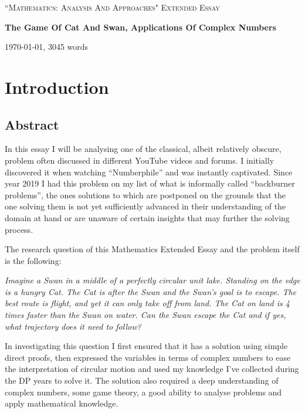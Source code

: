 \documentclass[12pt]{article}
\begin{document}
\begin{titlepage}
	\centering
	\vspace{1cm}
	{\Large \textsc{``Mathematics: Analysis And Approaches" Extended Essay}\par}
	\vspace{1.5cm}
	{\huge\bfseries The Game Of Cat And Swan, Applications Of Complex Numbers\par}
	\vspace{2cm}
	\vfill
	{\large \today, 3045 words\par}
\end{titlepage}

\clearpage
{}
\tableofcontents


\section{Introduction}
\subsection{Abstract}

In this essay I will be analysing one of the classical, albeit relatively obscure, problem often discussed in different YouTube videos and forums. I initially discovered it when watching ``Numberphile''\cite{Catandmouse} and was instantly captivated. Since year 2019 I had this problem on my list of what is informally called ``backburner problems'', the ones solutions to which are postponed on the grounds that the one solving them is not yet sufficiently advanced in their understanding of the domain at hand or are unaware of certain insights that may further the solving process.

The research question of this Mathematics Extended Essay and the problem itself is the following:

\emph{Imagine a Swan in a middle of a perfectly circular unit lake. Standing on the edge is a hungry Cat. The Cat is after the Swan and the Swan's goal is to escape. The best route is flight, and yet it can only take off from land. The Cat on land is 4 times faster than the Swan on water. Can the Swan escape the Cat and if yes, what trajectory does it need to follow?}

In investigating this question I first ensured that it has a solution using simple direct proofs, then expressed the variables in terms of complex numbers to ease the interpretation of circular motion and used my knowledge I've collected during the DP years to solve it. The solution also required a deep understanding of complex numbers, some game theory, a good ability to analyse problems and apply mathematical knowledge. 
\end{document}
